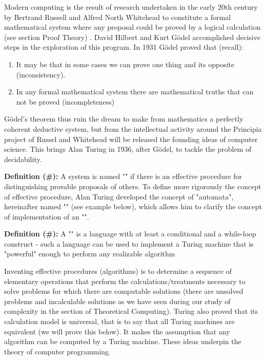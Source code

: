 	Modern computing is the result of research undertaken in the early 20th century by Bertrand Russell and Alfred North Whitehead to constitute a formal mathematical system where any proposal could be proved by a logical calculation (see section Proof Theory) . David Hilbert and Kurt Gödel accomplished decisive steps in the exploration of this program. In 1931 Gödel proved that (recall):
	\begin{enumerate}
		\item It may be that in some cases we can prove one thing and its opposite (inconsistency).
		
		\item In any formal mathematical system there are mathematical truths that can not be proved (incompleteness)
	\end{enumerate}
	Gödel's theorem thus ruin the dream to make from mathematics a perfectly coherent deductive system, but from the intellectual activity around the Principia project of Russel and Whitehead will be released the founding ideas of computer science. This brings Alan Turing in 1936, after Gödel, to tackle the problem of decidability.
	
	\textbf{Definition (\#\mydef):} A system is named "" if there is an effective procedure for distinguishing provable proposals of others. To define more rigorously the concept of effective procedure, Alan Turing developed the concept of "automata", hereinafter named "" (see example below), which allows him to clarify the concept of implementation of an "".
	
	\textbf{Definition (\#\mydef):} A "" is a language with at least a conditional and a while-loop construct - such a language can be used to implement a Turing machine that is "powerful" enough to perform any realizable algorithm 
	
	Inventing effective procedures (algorithms) is to determine a sequence of elementary operations that perform the calculations/treatments necessary to solve problems for which there are computable solutions (there are unsolved problems and incalculable solutions as we have seen during our study of complexity in the section of Theoretical Computing). Turing also proved that its calculation model is universal, that is to say that all Turing machines are equivalent (we will prove this below). It makes the assumption that any algorithm can be computed by a Turing machine. These ideas underpin the theory of computer programming.
	
